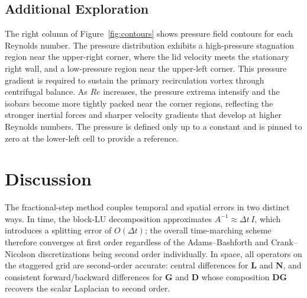 \documentclass[
  aapm,
  amsmath,amssymb,
  reprint,          %
  floatfix
]{revtex4-2}
\begin{document}
\subsection{Additional Exploration}
%
%
The right column of Figure~\ref{fig:contours} shows pressure field contours for each
Reynolds number. The pressure distribution exhibits a high-pressure stagnation region
near the upper-right corner, where the lid velocity meets the stationary right wall, and
a low-pressure region near the upper-left corner. This pressure gradient is required to
sustain the primary recirculation vortex through centrifugal balance. As $Re$ increases,
the pressure extrema intensify and the isobars become more tightly packed near the
corner regions, reflecting the stronger inertial forces and sharper velocity gradients
that develop at higher Reynolds numbers. The pressure is defined only up to a constant
and is pinned to zero at the lower-left cell to provide a reference.

\section{Discussion}
%
%
The fractional-step method couples temporal and spatial errors in two distinct ways.
In time, the block-LU decomposition approximates $A^{-1}\approx\Delta t\,I$, which
introduces a splitting error of $O(\Delta t)$; the overall time-marching scheme
therefore converges at first order regardless of the Adams--Bashforth and
Crank--Nicolson discretizations being second order individually. In
space, all operators on the staggered grid are second-order accurate: central differences
for $\mathbf{L}$ and $\mathbf{N}$, and consistent forward/backward differences for
$\mathbf{G}$ and $\mathbf{D}$ whose composition $\mathbf{DG}$ recovers the scalar
Laplacian to second order.
\end{document}
